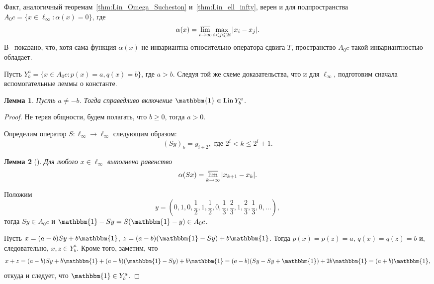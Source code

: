 \documentclass[a4paper,14pt]{article} %
\theoremstyle{plain}
\newtheorem{lemma}{Лемма}[section]
\begin{document}
Факт, аналогичный теоремам~\ref{thm:Lin_Omega_Sucheston} и~\ref{thm:Lin_ell_infty}, верен и для подпространства
$A_0 c = \{ x \in \ell_\infty : \alpha(x) =0 \}$,
где~\cite{our-vzms-2018}
\begin{equation*}
	\alpha(x) = \varlimsup_{i\to\infty} \max_{i<j\leqslant 2i} |x_i - x_j|
	.
\end{equation*}
В~\cite{our-ped-2018-alpha-Tx} показано, что, хотя сама функция $\alpha(x)$ не инвариантна относительно оператора сдвига $T$,
пространство $A_0 c$ такой инвариантностью обладает.

Пусть $Y^a_b = \{x\in A_0 c : p(x) = a, q(x) = b\}$, где $a>b$.
Следуя той же схеме доказательства, что и для $\ell_\infty$,
подготовим сначала вспомогательные леммы о константе.

\begin{lemma}
	\label{lem:const_Lin_alpha_0}
	Пусть $a\neq -b$.
	Тогда справедливо включение
	$\mathbbm{1}\in \operatorname{Lin} Y^a_b$.
\end{lemma}


\begin{proof}
	Не теряя общности, будем полагать, что $b\geq 0$, тогда $a>0$.

	Определим оператор $S:\ell_\infty \to \ell_\infty$ следующим образом:
	\begin{equation}\label{operator_S}
		(Sy)_k = y_{i+2}, \mbox{ где } 2^i < k \leq 2^i+1
		.
	\end{equation}
	\begin{lemma}[{\cite{our-vzms-2018}}]
		Для любого $x\in \ell_\infty$ выполнено равенство
		\begin{equation}\label{alpha_S}
			\alpha(Sx) = \varlimsup_{k\to\infty} |x_{k+1} - x_{k}|
			.
		\end{equation}
	\end{lemma}
	Положим
	\begin{equation}
		\label{eq:y_for_s_alpha}
		y = \left(0,1,0,\frac{1}{2},1,\frac{1}{2},0,\frac{1}{3},\frac{2}{3},1,\frac{2}{3},\frac{1}{3},0,...\right)
		,
	\end{equation}
	тогда $Sy\in A_0 c$ и $\mathbbm{1}-Sy = S(\mathbbm{1}-y)\in A_0 c$.

	Пусть $x=(a-b)Sy+b\mathbbm{1}$, $z=(a-b)(\mathbbm{1}-Sy)+b\mathbbm{1}$.
	Тогда $p(x)=p(z)=a$, $q(x)=q(z)=b$ и, следовательно, $x,z\in Y^a_b$.
	Кроме того, заметим, что
	\begin{equation}
		x+z = (a-b)Sy+b\mathbbm{1} + (a-b)(\mathbbm{1}-Sy)+b\mathbbm{1}
		=
		(a-b)(Sy-Sy+\mathbbm{1}) + 2 b\mathbbm{1} = (a+b)\mathbbm{1}
		,
	\end{equation}
	откуда и следует, что $\mathbbm{1}\in Y^a_b$.
\end{proof}
\end{document}
